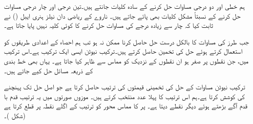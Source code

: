 ہم خطی اور دو درجی مساوات حل کرنے کے سادہ کلیات جانتے ہیں۔تین درجی اور چار درجی مساوات حل کرنے کے نسبتاً مشکل کلیات بھی پائے جاتے ہیں۔ ناروے کے ریاضی دان نیلز ہنری ایبل () نے ثابت کیا کہ  چار سے زیادہ درجے کی مساوات حل کرنے کا کوئی کلیہ نہیں پایا جاتا ہے۔

جب  طرز کی مساوات کا بالکل درست حل حاصل کرنا ممکن نہ ہو تب ہم احصاء کے اعدادی طریقوں کو استعمال کرتے ہوئے حل کی تخمین حاصل کرتے ہیں۔ترکیب نیوٹن ایسی ایک ترکیب ہے۔اس ترکیب میں، جن نقطوں پر  صفر ہو ان نقطوں کے نزدیک  کو مماس سے ظاہر کیا جاتا ہے۔ یہاں بھی خط بندی کے ذریعہ مسائل حل کیے جاتے ہیں۔

ترکیب نیوٹن مساوات  کے حل کی تخمینی قیمتوں کی ترتیب حاصل کرتا ہے جو اصل حل تک پہنچنے کی کوشش کرتا ہے۔ہم اس ترتیب کا پہلا عدد  منتخب کرتے ہیں۔ موزوں صورتوں میں یہ ترتیب قدم با قدم آگے بڑھتے ہوئے دیگر نقطے دیتا ہے۔   پر  کا مماس    محور کو ترتیب کے اگلے نقطہ  پر قطع کرتا ہے (شکل )۔
